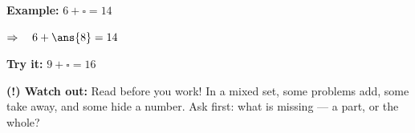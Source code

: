 \documentclass[12pt]{article}
\begin{document}
\begin{examplebox}
\textbf{Example:} \quad $6 + \square = 14$

$\Rightarrow\quad 6 + \ans{8} = 14$
\end{examplebox}

\begin{tryitbox}
\textbf{Try it:} \quad $9 + \square = 16$\\[2pt]
\end{tryitbox}

\begin{watchoutbox}
\textbf{(!) Watch out:} Read before you work! In a mixed set, some problems
add, some take away, and some hide a number. Ask first: what is missing ---
a part, or the whole?
\end{watchoutbox}
\end{document}
